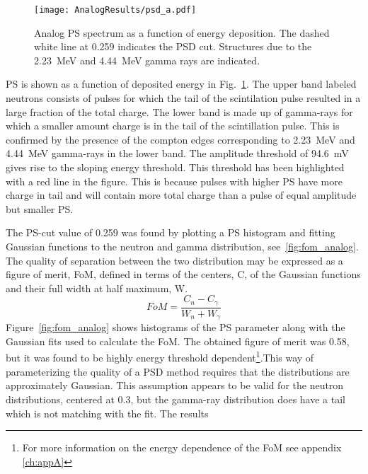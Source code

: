 \documentclass[main.tex]{subfiles}
\begin{document}
\begin{figure}[ht]
    \centering
        \texttt{[image: AnalogResults/psd\_a.pdf]}
        \caption[Analog PS spectrum as a function of energy deposition.]{Analog PS spectrum as a function of energy deposition. The dashed white line at 0.259 indicates the PSD cut. Structures due to the \SI{2.23}{MeV} and \SI{4.44}{MeV} gamma rays are indicated.}
        \label{fig:psd_a}
\end{figure}

PS is shown as a function of deposited energy in Fig.~\ref{fig:psd_a}. The upper band labeled neutrons consists of pulses for which the tail of the scintilation pulse resulted in a large fraction of the total charge. The lower band is made up of gamma-rays for which a smaller amount charge is in the tail of the scintillation pulse. 
This is confirmed by the presence of the compton edges corresponding to \SI{2.23}{MeV} and \SI{4.44}{MeV} gamma-rays in the lower band. The amplitude threshold of \SI{94.6}{mV} gives rise to the sloping energy threshold. This threshold has been highlighted with a red line in the figure. This is because pulses with higher PS  have more charge in tail and will contain more total charge than a pulse of equal amplitude but smaller PS.

The PS-cut value of 0.259 was found by plotting a PS histogram and fitting Gaussian functions to the neutron and gamma distribution, see~\ref{fig:fom_analog}. The quality of separation between the two distribution may be expressed as a figure of merit, FoM, defined in terms of the centers, C, of the Gaussian functions and their full width at half maximum, W.
\begin{equation}
FoM = \frac{C_n - C_\gamma}{W_n + W_\gamma}
\end{equation}
Figure~\ref{fig:fom_analog} shows histograms of the PS parameter along with the Gaussian fits used to calculate the FoM. The obtained figure of merit was 0.58, but it was found to be highly energy threshold dependent\footnote{For more information on the energy dependence of the FoM see appendix \ref{ch:appA}}.This way of parameterizing the quality of a PSD method requires that the distributions are approximately Gaussian. This assumption appears to be valid for the neutron distributions, centered at 0.3, but the gamma-ray distribution does have a tail which is not matching with the fit. The results 

\end{document}
